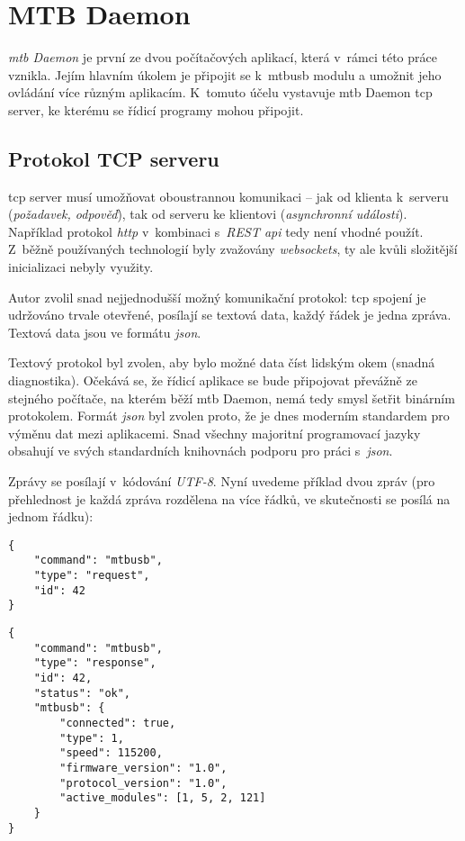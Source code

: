 \newpage
\section{MTB Daemon}

\textit{\gls{mtb} Daemon} je první ze dvou počítačových aplikací, která v~rámci
této práce vznikla. Jejím hlavním úkolem je připojit se k~\gls{mtbusb} modulu a
umožnit jeho ovládání více různým aplikacím. K~tomuto účelu vystavuje \gls{mtb}
Daemon \gls{tcp} server, ke kterému se řídicí programy mohou připojit.

\subsection{Protokol TCP serveru} \label{sec:daemon:proto}

\gls{tcp} server musí umožňovat oboustrannou komunikaci – jak od klienta k~serveru
(\textit{požadavek, odpověď}), tak od serveru ke klientovi (\textit{asynchronní
události}). Například protokol \textit{http} v~kombinaci s~\textit{REST \gls{api}}
tedy není vhodné použít. Z~běžně používaných technologií byly zvažovány
\textit{websockets}, ty ale kvůli složitější inicializaci nebyly využity.

Autor zvolil snad nejjednodušší možný komunikační protokol: \gls{tcp} spojení
je udržováno trvale otevřené, posílají se textová data, každý řádek je jedna
zpráva. Textová data jsou ve formátu \textit{json}.

Textový protokol byl zvolen, aby bylo možné data číst lidským okem
(snadná diagnostika). Očekává se, že řídicí aplikace se bude připojovat
převážně ze stejného počítače, na kterém běží \gls{mtb} Daemon, nemá tedy smysl
šetřit  binárním protokolem.
Formát \textit{json} byl zvolen proto, že je dnes moderním standardem pro
výměnu dat mezi aplikacemi. Snad všechny majoritní programovací jazyky obsahují
ve svých standardních knihovnách podporu pro práci s~\textit{json}.

Zprávy se posílají v~kódování \textit{UTF-8}. Nyní uvedeme příklad
dvou zpráv (pro přehlednost je každá zpráva rozdělena na více řádků, ve
skutečnosti se posílá na jednom řádku):

\begin{verbatim}
{
    "command": "mtbusb",
    "type": "request",
    "id": 42
}
\end{verbatim}
\newpage
\begin{verbatim}
{
    "command": "mtbusb",
    "type": "response",
    "id": 42,
    "status": "ok",
    "mtbusb": {
        "connected": true,
        "type": 1,
        "speed": 115200,
        "firmware_version": "1.0",
        "protocol_version": "1.0",
        "active_modules": [1, 5, 2, 121]
    }
}
\end{verbatim}

